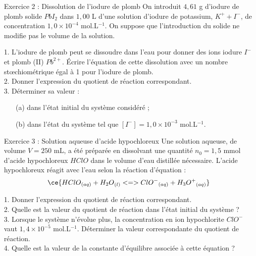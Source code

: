 \documentclass[12pt, french]{article}
\begin{document}
\begin{Box2}{Exercice 2 : Dissolution de l’iodure de plomb}
On introduit $4,61$ g d’iodure de plomb solide $PbI_2$ dans $1,00$ L d’une solution d’iodure de potassium, $K^+ + I^-$, de concentration $1,0 \times 10^{-4}$ mol.L$^{-1}$. On suppose que l’introduction du solide ne modifie pas le volume de la solution.

1. L’iodure de plomb peut se dissoudre dans l’eau pour donner des ions iodure $I^-$ et plomb (II) $Pb^{2+}$. Écrire l’équation de cette dissolution avec un nombre stœchiométrique égal à 1 pour l’iodure de plomb.\\

2. Donner l’expression du quotient de réaction correspondant.\\

3. Déterminer sa valeur :
   \begin{itemize}
       \item[(a)] dans l’état initial du système considéré ;
       \item[(b)] dans l’état du système tel que $[I^-] = 1,0 \times 10^{-3}$ mol.L$^{-1}$.
   \end{itemize}
\end{Box2}


\begin{Box2}{Exercice 3 : Solution aqueuse d’acide hypochloreux}
Une solution aqueuse, de volume $V = 250$ mL, a été préparée en dissolvant une quantité $n_0 = 1,5$ mmol d’acide hypochloreux $HClO$ dans le volume d’eau distillée nécessaire. L’acide hypochloreux réagit avec l’eau selon la réaction d’équation :
\[
  \ce{{HClO}_{(aq)} + {H_2O}_{(l)} <=> {ClO^-}_{(aq)} + {H_3O^+}_{(aq)}}
\]

1. Donner l’expression du quotient de réaction correspondant.\\

2. Quelle est la valeur du quotient de réaction dans l’état initial du système ?\\

3. Lorsque le système n’évolue plus, la concentration en ion hypochlorite $ClO^-$ vaut $1,4 \times 10^{-5}$ mol.L$^{-1}$. Déterminer la valeur correspondante du quotient de réaction.\\

4. Quelle est la valeur de la constante d’équilibre associée à cette équation ?
\end{Box2}
\end{document}
